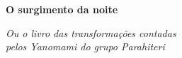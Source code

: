 \pagebreak
\blankpage

\pagebreak
\blankpage






\begingroup\thispagestyle{empty}\vspace*{.05\textheight} 

              \formular
              \huge
              \noindent
              \textbf{O surgimento da noite}
              
              \vspace{0.3em}

              \noindent\normalsize\textit{Ou o livro das transformações contadas\\pelos Yanomami do  grupo Parahiteri}
                    
\endgroup
\vfill
\pagebreak